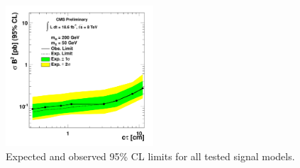 \begin{figure}[htbp]
\includegraphics[width=0.49\textwidth]{plots/limits/200_50e.pdf}

\caption{Expected and observed 95\% CL limits for all tested signal models.\label{fig:limits}}
\end{figure}

